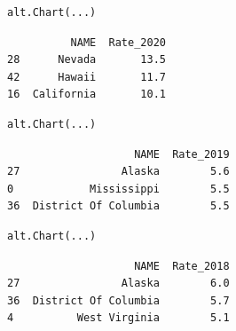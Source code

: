 \documentclass[
  letterpaper,
  DIV=11,
  numbers=noendperiod]{scrartcl}
\begin{document}
\begin{verbatim}
alt.Chart(...)
\end{verbatim}

\begin{verbatim}
          NAME  Rate_2020
28      Nevada       13.5
42      Hawaii       11.7
16  California       10.1
\end{verbatim}

\begin{verbatim}
alt.Chart(...)
\end{verbatim}

\begin{verbatim}
                    NAME  Rate_2019
27                Alaska        5.6
0            Mississippi        5.5
36  District Of Columbia        5.5
\end{verbatim}

\begin{verbatim}
alt.Chart(...)
\end{verbatim}

\begin{verbatim}
                    NAME  Rate_2018
27                Alaska        6.0
36  District Of Columbia        5.7
4          West Virginia        5.1
\end{verbatim}
\end{document}
